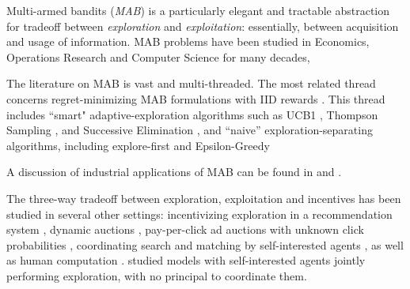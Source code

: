  Multi-armed bandits (\emph{MAB}) is a particularly elegant and tractable abstraction for tradeoff between \emph{exploration} and \emph{exploitation}: essentially, between acquisition and usage of information. MAB problems have been studied in Economics, Operations Research and Computer Science for many decades, 

The literature on MAB is vast and multi-threaded. The most related
thread concerns regret-minimizing MAB formulations with IID rewards
\citep{Lai-Robbins-85,bandits-ucb1}. This thread includes ``smart" adaptive-exploration
algorithms such as UCB1
\citep{bandits-ucb1}, Thompson Sampling \citep{TS-survey-FTML18}, and Successive Elimination
\citep{EvenDar-icml06}, and ``naive'' exploration-separating algorithms, including explore-first and
Epsilon-Greedy


A discussion of industrial applications of MAB can be found in \citep{DS-arxiv} and \citep[Chapter 8]{slivkins-MABbook}. 

The three-way tradeoff between exploration, exploitation and incentives has been studied in several other settings:
incentivizing exploration in a recommendation system
    \citep[\eg][]{Che-13,Frazier-ec14,Kremer-JPE14,ICexploration-ec15,Bimpikis-exploration-ms17,Bahar-ec16,Jieming-unbiased18},
dynamic auctions
    \cite[\eg][]{AtheySegal-econometrica13,DynPivot-econometrica10,Kakade-pivot-or13},
pay-per-click ad auctions with unknown click probabilities
    \cite[\eg][]{MechMAB-ec09,DevanurK09,Transform-ec10-jacm},
coordinating search and matching by self-interested agents
    \citep{Bobby-Glen-ec16},
as well as human computation
    \cite[\eg][]{RepeatedPA-ec14,Ghosh-itcs13,Krause-www13}.
\citet{Bolton-econometrica99,Keller-econometrica05,Johari-ec12} studied models with self-interested agents jointly performing exploration, with no principal to coordinate them.


